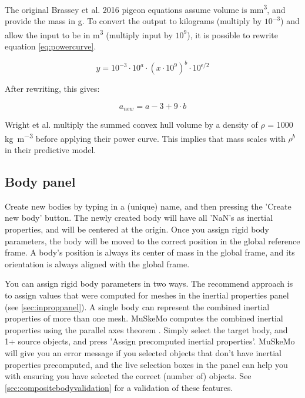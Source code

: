 \documentclass{article}
\begin{document}
The original Brassey et al. 2016 \cite{brasseyConvexhullMassEstimates2016} pigeon equations assume volume is  \si{mm^3}, and provide the mass in \si{g}. To convert the output to kilograms (multiply by \(10^{-3}\)) and allow the input to be in \si{m^3} (multiply input by \(10^9\)), it is possible to rewrite equation \ref{eq:powercurve}.

\begin{equation}
y = 10^{-3} \cdot 10^a \cdot (x \cdot 10^9 )^{b} \cdot 10^{\epsilon /2}
\end{equation}

After rewriting, this gives:

\begin{equation}
    a_{new} = a - 3 + 9\cdot b
\end{equation}

Wright et al. \cite{wrightVolumetricElementscalingMass2024} multiply the summed convex hull volume by a density of \(\rho\) = 1000 \si{kg m^{-3}} before applying their power curve. This implies that mass scales with \(\rho^b\) in their predictive model.




\subsection{Body panel}
\label{sec:bodypanel}

Create new bodies by typing in a (unique) name, and then pressing the 'Create new body' button. The newly created body will have all 'NaN's as inertial properties, and will be centered at the origin. Once you assign rigid body parameters, the body will be moved to the correct position in the global reference frame. A body's position is always its center of mass in the global frame, and its orientation is always aligned with the global frame.

You can assign rigid body parameters in two ways. The recommend approach is to assign values that were computed for meshes in the inertial properties panel (see \ref{sec:inproppanel}). A single body can represent the combined inertial properties of more than one mesh. MuSkeMo computes the combined inertial properties using the parallel axes theorem \cite{valleryAdvancedDynamics2019,ruinaMechanicsToolsetStatics2019}. Simply select the target body, and 1+ source objects, and press 'Assign precomputed inertial properties'. MuSkeMo will give you an error message if you selected objects that don't have inertial properties precomputed, and the live selection boxes in the panel can help you with ensuring you have selected the correct (number of) objects. See \ref{sec:compositebodyvalidation} for a validation of these features.
\end{document}
